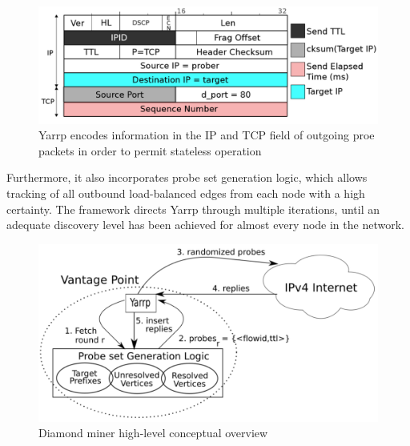 \begin{figure}[!ht]
  \begin{center}
    \includegraphics[scale=0.3]{images/yarrp.png}
    \caption{Yarrp encodes information in the IP and TCP field of outgoing proe packets in order to permit stateless operation \cite{yarrp}}
    \label{figure:yarrp_fig}
  \end{center}
\end{figure}

Furthermore, it also incorporates probe set generation logic, which allows tracking of all outbound load-balanced edges from each node with a high certainty. The framework directs Yarrp through multiple iterations, until an adequate discovery level has been achieved for almost every node in the network. \cite{diamond-miner}

\begin{figure}[!ht]
  \begin{center}
    \includegraphics[scale=0.3]{images/diamond.png}
    \caption{Diamond miner high-level conceptual overview \cite{diamond-miner}}
    \label{figure:dminer_overview_fig}
  \end{center}
\end{figure}

